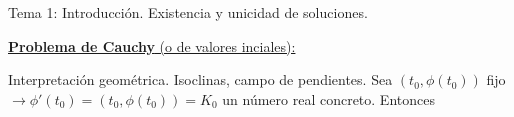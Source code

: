 \documentclass{article}
\begin{document}
\begin{section}{Tema 1: Introducción. Existencia y unicidad de soluciones.}
\begin{subsection}{\underline{\textbf{Problema de Cauchy} (o de valores inciales):}}
\begin{subsection}{Interpretación geométrica. Isoclinas, campo de pendientes.}
            Sea $(t_0, \phi(t_0))$ fijo $\longrightarrow \phi'(t_0) = (t_0, \phi(t_0)) = K_0$ un número real concreto. Entonces 
            
        \end{subsection}
    \end{subsection}

\end{section}
\end{document}

